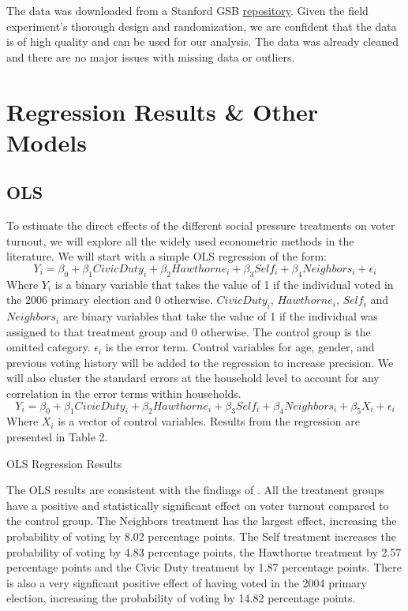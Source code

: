 \documentclass[11pt]{article}
\begin{document}
The data was downloaded from a Stanford GSB \href{https://github.com/gsbDBI/ExperimentData}{repository}. Given the field experiment's thorough design and randomization, we are confident that the data is of high quality and can be used for our analysis. The data was already cleaned and there are no major issues with missing data or outliers.
\section{Regression Results \& Other Models}
\subsection{OLS}
To estimate the direct effects of the different social pressure treatments on voter turnout, we will explore all the widely used econometric methods in the literature. We will start with a simple OLS regression of the form:
\begin{equation}
    Y_i = \beta_0 + \beta_1 CivicDuty_i + \beta_2 Hawthorne_i + \beta_3 Self_i + \beta_4 Neighbors_i + \epsilon_i
\end{equation}
Where $Y_i$ is a binary variable that takes the value of 1 if the individual voted in the 2006 primary election and 0 otherwise. $CivicDuty_i$, $Hawthorne_i$, $Self_i$ and $Neighbors_i$ are binary variables that take the value of 1 if the individual was assigned to that treatment group and 0 otherwise. The control group is the omitted category. $\epsilon_i$ is the error term.
Control variables for age, gender, and previous voting history will be added to the regression to increase precision. We will also cluster the standard errors at the household level to account for any correlation in the error terms within households.
\begin{equation}
    Y_i = \beta_0 + \beta_1 CivicDuty_i + \beta_2 Hawthorne_i + \beta_3 Self_i + \beta_4 Neighbors_i + \beta_5 X_i + \epsilon_i
\end{equation}
Where $X_i$ is a vector of control variables. Results from the regression are presented in Table 2. 
\begin{table}[H]
    
    \caption{OLS Regression Results}        
\end{table}
The OLS results are consistent with the findings of \cite{gerber_social_2008}. All the treatment groups have a positive and statistically significant effect on voter turnout compared to the control group. The Neighbors treatment has the largest effect, increasing the probability of voting by 8.02 percentage points. The Self treatment increases the probability of voting by 4.83 percentage points, the Hawthorne treatment by 2.57 percentage points and the Civic Duty treatment by 1.87 percentage points. There is also a very signficant positive effect of having voted in the 2004 primary election, increasing the probability of voting by 14.82 percentage points.
\end{document}
